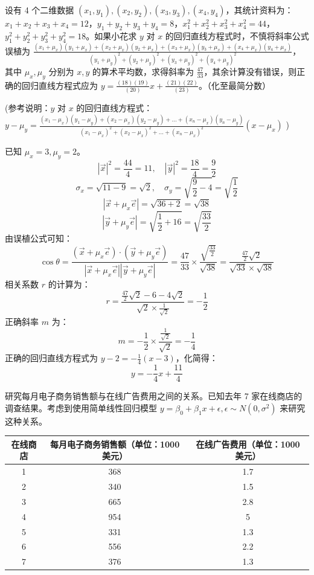 \begin{questions}
    \question
设有 4 个二维数据 $(x_1, y_1), (x_2, y_2), (x_3, y_3), (x_4, y_4)$，其统计资料为：$x_1+x_2+x_3+x_4=12$，$y_1+y_2+y_3+y_4=8$，$x_1^2+x_2^2+x_3^2+x_4^2=44$，$y_1^2+y_2^2+y_3^2+y_4^2=18$。如果小花求 $y$ 对 $x$ 的回归直线方程式时，不慎将斜率公式误植为 $\frac{(x_1+\mu_x)(y_1+\mu_x)+(x_2+\mu_x)(y_2+\mu_x)+(x_3+\mu_x)(y_3+\mu_x)+(x_4+\mu_x)(y_4+\mu_x)}{(y_1+\mu_y)^2+(y_2+\mu_y)^2+(y_3+\mu_y)^2+(y_4+\mu_y)^2}$，其中 $\mu_x, \mu_y$ 分别为 $x, y$ 的算术平均数，求得斜率为 $\frac{47}{33}$，其余计算没有错误，则正确的回归直线方程式应为 $y = \frac{(18)(19)}{(20)}x + \frac{(21)(22)}{(23)}$。（化至最简分数）

(参考说明：$y$ 对 $x$ 的回归直线方程式：$y-\mu_y = \frac{(x_1-\mu_x)(y_1-\mu_y)+(x_2-\mu_x)(y_2-\mu_y)+\dots+(x_n-\mu_x)(y_n-\mu_y)}{(x_1-\mu_x)^2+(x_2-\mu_x)^2+\dots+(x_n-\mu_x)^2}(x-\mu_x)$ )

\begin{solution}
已知 $\mu_x = 3, \mu_y = 2$。
\[
|\vec{x}|^2 = \frac{44}{4} = 11, \quad |\vec{y}|^2 = \frac{18}{4} = \frac{9}{2}
\]
\[
\sigma_x = \sqrt{11 - 9} = \sqrt{2}, \quad \sigma_y = \sqrt{\frac{9}{2} - 4} = \sqrt{\frac{1}{2}}
\]
\[
|\vec{x} + \mu_x \vec{e}| = \sqrt{36 + 2} = \sqrt{38}
\]
\[
|\vec{y} + \mu_y \vec{e}| = \sqrt{\frac{1}{2} + 16} = \sqrt{\frac{33}{2}}
\]
由误植公式可知：
\[
\cos \theta = \frac{(\vec{x} + \mu_x \vec{e}) \cdot (\vec{y} + \mu_y \vec{e})}{|\vec{x} + \mu_x \vec{e}| |\vec{y} + \mu_y \vec{e}|} = \frac{47}{33} \times \frac{\sqrt{\frac{33}{2}}}{\sqrt{38}} = \frac{\frac{47}{2}\sqrt{2}}{\sqrt{33} \times \sqrt{38}}
\]
相关系数 $r$ 的计算为：
\[
r = \frac{\frac{47}{2}\sqrt{2} - 6 - 4\sqrt{2}}{\sqrt{2} \times \frac{1}{\sqrt{2}}} = -\frac{1}{2}
\]
正确斜率 $m$ 为：
\[
m = -\frac{1}{2} \times \frac{\frac{1}{\sqrt{2}}}{\sqrt{2}} = -\frac{1}{4}
\]
正确的回归直线方程式为 $y - 2 = -\frac{1}{4}(x - 3)$，化简得：
\[
y = -\frac{1}{4}x + \frac{11}{4}
\]
\end{solution}

    \question
研究每月电子商务销售额与在线广告费用之间的关系。已知去年 7 家在线商店的调查结果。考虑到使用简单线性回归模型 $y = \beta_0 + \beta_1 x + \epsilon, \epsilon \sim N(0, \sigma^2)$ 来研究这种关系。

\begin{center}
\begin{tabular}{c|c|c}
在线商店 & 每月电子商务销售额（单位：1000 美元） & 在线广告费用（单位：1000 美元） \\ \hline
1 & 368 & 1.7 \\
2 & 340 & 1.5 \\
3 & 665 & 2.8 \\
4 & 954 & 5 \\
5 & 331 & 1.3 \\
6 & 556 & 2.2 \\
7 & 376 & 1.3 \\
\end{tabular}
\end{center}



\end{questions}
